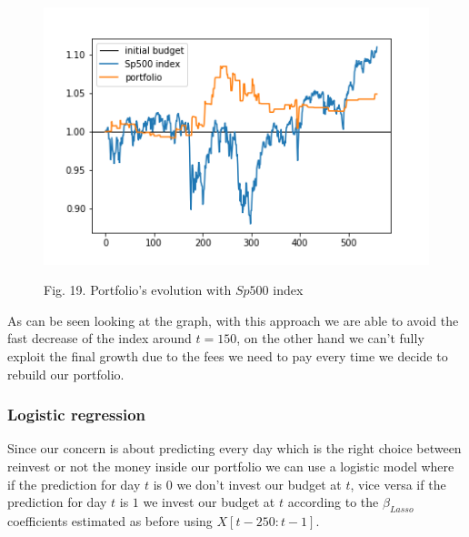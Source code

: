 \documentclass{article}%
\begin{document}
    \begin{figure}[h!]
  \centering
  \includegraphics[scale=0.6]{act_portfolio.png}
  \begin{center}
\begin{small}
Fig. 19. Portfolio's evolution with $Sp500$ index

\end{small}
\end{center}
  \label{portfolio_alpha}
  \end{figure}

As can be seen looking at the graph, with this approach we are able to avoid the fast decrease of the index around $t=150$, on the other hand we can't fully exploit the final growth due to the fees we need to pay every time we decide to rebuild our portfolio.

\subsubsection{Logistic regression}
Since our concern is about predicting every day which is the right choice between reinvest or not the money inside our portfolio we can use a logistic model where if the prediction for day $t$ is $0$ we don't invest our budget at $t$, vice versa if the prediction for day $t$ is $1$ we invest our budget at $t$ according to the $\beta_{Lasso}$ coefficients estimated as before using $X[t-250:t-1]$.
\end{document}
